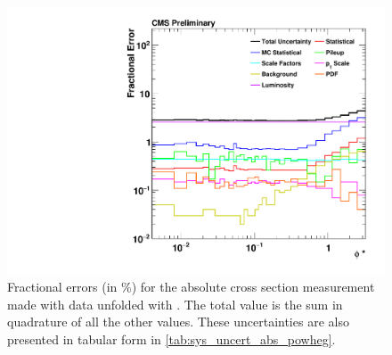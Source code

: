 \begin{figure}[!p]
    \centering
    \includegraphics[width=\textwidth]{figures/data_uncertainty_absolute_powheg_unfolded.pdf}
    \caption[
        Fractional errors for the absolute cross section measurement
        made with data unfolded with \POWHEG.
    ]{
        Fractional errors (in \%) for the absolute cross section measurement
        made with data unfolded with \POWHEG. The total value is the sum in
        quadrature of all the other values. These uncertainties are also
        presented in tabular form in \cref{tab:sys_uncert_abs_powheg}.
    }
    \label{fig:sys_uncert_abs_powheg}
\end{figure}
